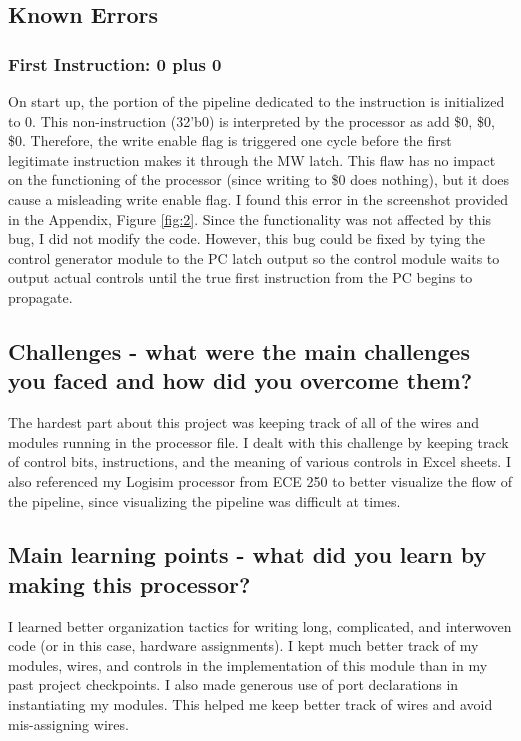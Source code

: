 \documentclass[letterpaper]{article} %
\begin{document}
\subsection{Known Errors}
\subsubsection{First Instruction: 0 plus 0}
On start up, the portion of the pipeline dedicated to the instruction is initialized to 0. This non-instruction (32'b0) is interpreted by the processor as add \$0, \$0, \$0. Therefore, the write enable flag is triggered one cycle before the first legitimate instruction makes it through the MW latch. This flaw has no impact on the functioning of the processor (since writing to \$0 does nothing), but it does cause a misleading write enable flag. I found this error in the screenshot provided in the Appendix, Figure \ref{fig:2}. Since the functionality was not affected by this bug, I did not modify the code. However, this bug could be fixed by tying the control generator module to the PC latch output so the control module waits to output actual controls until the true first instruction from the PC begins to propagate. 

\subsection{Challenges - what were the main challenges you faced and how did you
overcome them?}
The hardest part about this project was keeping track of all of the wires and modules running in the processor file. I dealt with this challenge by keeping track of control bits, instructions, and the meaning of various controls in Excel sheets. I also referenced my Logisim processor from ECE 250 to better visualize the flow of the pipeline, since visualizing the pipeline was difficult at times.

\subsection{Main learning points - what did you learn by making this processor?}
I learned better organization tactics for writing long, complicated, and interwoven code (or in this case, hardware assignments). I kept much better track of my modules, wires, and controls in the implementation of this module than in my past project checkpoints. I also made generous use of port declarations in instantiating my modules. This helped me keep better track of wires and avoid mis-assigning wires. 
\end{document}
